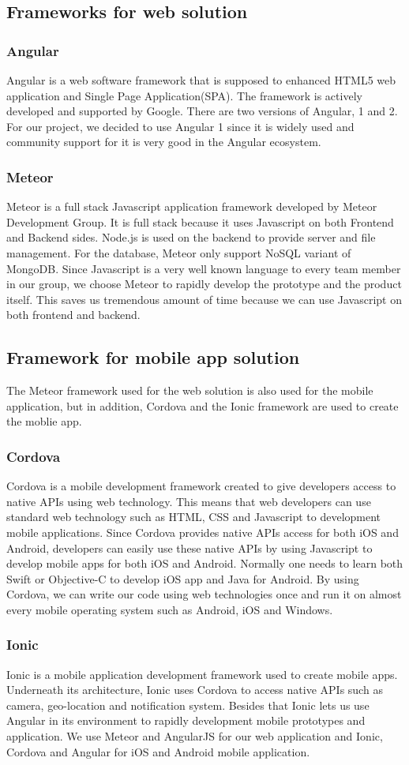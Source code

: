 \subsection{Frameworks for web solution}
\subsubsection{Angular}
Angular is a web software framework that is supposed to enhanced HTML5 web application and Single Page Application(SPA). The framework is actively developed and supported by Google. There are two versions of Angular, 1 and 2. For our project, we decided to use Angular 1 since it is widely used and community support for it is very good in the Angular ecosystem. 
\subsubsection{Meteor}
Meteor is a full stack Javascript application framework developed by Meteor Development Group. It is full stack because it uses Javascript on both Frontend and Backend sides. Node.js is used on the backend to provide server and file management. For the database, Meteor only support NoSQL variant of MongoDB. Since Javascript is a very well known language to every team member in our group, we choose Meteor to rapidly develop the prototype and the product itself. This saves us tremendous amount of time because we can use Javascript on both frontend and backend. 
\subsection{Framework for mobile app solution}
The Meteor framework used for the web solution is also used for the mobile application, but in addition, Cordova and the Ionic framework  are used to create the moblie app.
\subsubsection{Cordova}
Cordova is a mobile development framework created to give developers access to native APIs using web technology. This means that web developers can use standard web technology such as HTML, CSS and Javascript to development mobile applications. Since Cordova provides native APIs access for both iOS and Android, developers can easily use these native APIs by using Javascript to develop mobile apps for both iOS and Android. Normally one needs to learn both Swift or Objective-C to develop iOS app and Java for Android. By using Cordova, we can write our code using web technologies once and run it on almost every mobile operating system such as Android, iOS and Windows. 
\subsubsection{Ionic}
Ionic is a mobile application development framework used to create mobile apps. Underneath its architecture, Ionic uses Cordova to access native APIs such as camera, geo-location and notification system. Besides that Ionic lets us use Angular in its environment to rapidly development mobile prototypes and application. We use Meteor and AngularJS for our web application and Ionic, Cordova and Angular for iOS and Android mobile application.